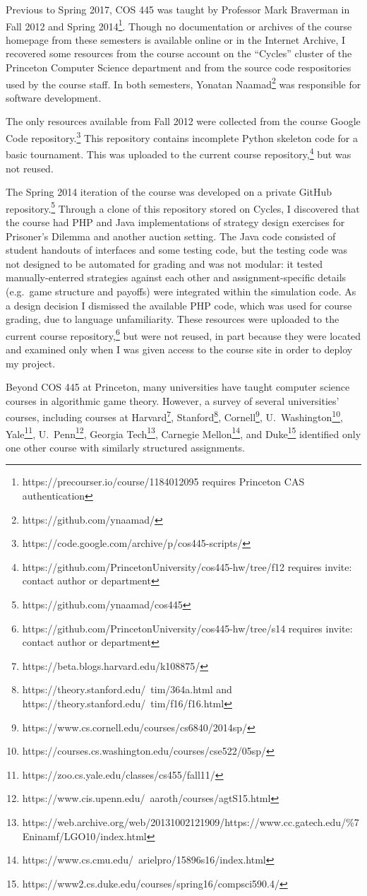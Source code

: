 \documentclass[pageno]{jpaper}
\begin{document}
Previous to Spring 2017, COS 445 was taught by Professor Mark Braverman in Fall 2012 and Spring 2014\footnote{https://precourser.io/course/1184012095 requires Princeton CAS authentication}.
Though no documentation or archives of the course homepage from these semesters is available online or in the Internet Archive, I recovered some resources from the course account on the ``Cycles'' cluster of the Princeton Computer Science department and from the source code respositories used by the course staff.
In both semesters, Yonatan Naamad\footnote{https://github.com/ynaamad/} was responsible for software development.

The only resources available from Fall 2012 were collected from the course Google Code repository.\footnote{https://code.google.com/archive/p/cos445-scripts/}
This repository contains incomplete Python skeleton code for a basic tournament.
This was uploaded to the current course repository,\footnote{https://github.com/PrincetonUniversity/cos445-hw/tree/f12 requires invite: contact author or department} but was not reused.

The Spring 2014 iteration of the course was developed on a private GitHub repository.\footnote{https://github.com/ynaamad/cos445}
Through a clone of this repository stored on Cycles, I discovered that the course had PHP and Java implementations of strategy design exercises for Prisoner's Dilemma and another auction setting.
The Java code consisted of student handouts of interfaces and some testing code, but the testing code was not designed to be automated for grading and was not modular: it tested manually-enterred strategies against each other and assignment-specific details (e.g.\ game structure and payoffs) were integrated within the simulation code.
As a design decision I dismissed the available PHP code, which was used for course grading, due to language unfamiliarity.
These resources were uploaded to the current course repository,\footnote{https://github.com/PrincetonUniversity/cos445-hw/tree/s14 requires invite: contact author or department} but were not reused, in part because they were located and examined only when I was given access to the course site in order to deploy my project.

Beyond COS 445 at Princeton, many universities have taught computer science courses in algorithmic game theory.
However, a survey of several universities' courses, including courses at Harvard\footnote{https://beta.blogs.harvard.edu/k108875/}, Stanford\footnote{https://theory.stanford.edu/~tim/364a.html and https://theory.stanford.edu/~tim/f16/f16.html}, Cornell\footnote{https://www.cs.cornell.edu/courses/cs6840/2014sp/}, U.\ Washington\footnote{https://courses.cs.washington.edu/courses/cse522/05sp/}, Yale\footnote{https://zoo.cs.yale.edu/classes/cs455/fall11/}, U.\ Penn\footnote{https://www.cis.upenn.edu/~aaroth/courses/agtS15.html}, Georgia Tech\footnote{https://web.archive.org/web/20131002121909/https://www.cc.gatech.edu/\%7Eninamf/LGO10/index.html}, Carnegie Mellon\footnote{https://www.cs.cmu.edu/~arielpro/15896s16/index.html}, and Duke\footnote{https://www2.cs.duke.edu/courses/spring16/compsci590.4/} identified only one other course with similarly structured assignments.
\end{document}
